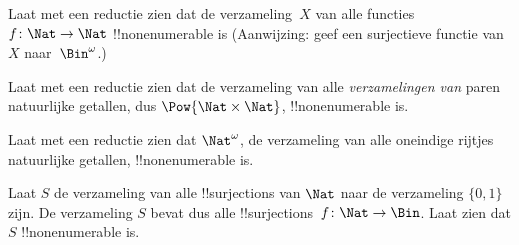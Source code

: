 \documentclass[openany]{memoir}
\begin{document}

\begin{prob}\label{sfr:siz:red:prob:nat-nat}
  Laat met een reductie zien dat de verzameling~$X$ van alle functies
  $f\colon \Nat \to \Nat$ !!{nonenumerable} is (Aanwijzing: geef een
  surjectieve functie van $X$ naar~$\Bin^\omega$.)
\end{prob}

\begin{prob}
Laat met een reductie zien dat de verzameling van alle
\emph{verzamelingen van} paren natuurlijke getallen, dus
$\Pow{\Nat \times \Nat}$, !!{nonenumerable} is.
\end{prob}

\begin{prob}
Laat met een reductie zien dat $\Nat^\omega$, de verzameling van alle
oneindige rijtjes natuurlijke getallen, !!{nonenumerable} is.
\end{prob}


\begin{prob}
Laat $S$ de verzameling van alle !!{surjection}s van $\Nat$ naar de
verzameling $\{0,1\}$ zijn. De verzameling $S$ bevat dus alle
!!{surjection}s~$f \colon \Nat \to \Bin$. Laat zien dat $S$
!!{nonenumerable} is.
\end{prob}
\end{document}
